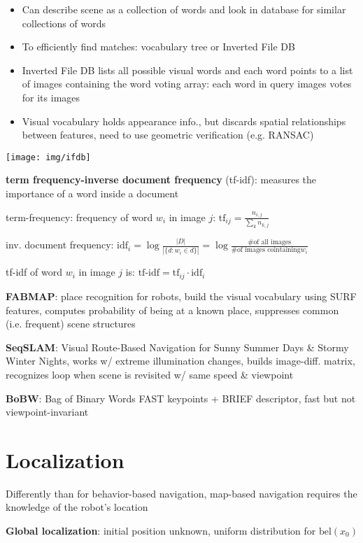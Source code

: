 \documentclass[fontsize=6pt]{scrartcl}
\begin{document}
\begin{multicols*}{4}
\begin{itemize}
	\item Can describe scene as a collection of words and look in database for similar collections of words
	\item To efficiently find matches: vocabulary tree or Inverted File DB
	\item Inverted File DB lists all possible visual words and each word points to a list of images containing the word
	voting array: each word in query images votes for its images
	\item Visual vocabulary holds appearance info., but discards spatial relationships between features, need to use geometric verification (e.g. RANSAC)
\end{itemize}

\texttt{[image: img/ifdb]}

\textbf{term frequency-inverse document frequency} (tf-idf): measures the importance of a word inside a document

term-frequency: frequency of word $w_i$ in image $j$: $\text{tf}_{ij} = \frac{n_{i,j}}{\sum_k n_{k,j}}$

inv. document frequency: $\text{idf}_i = \log \frac{|D|}{|\{d:w_i\in d\}|} = \log \frac{\text{\# of all images}}{\text{\# of images cointaining} w_i}$

tf-idf of word $w_i$ in image $j$ is: $\text{tf-idf} = \text{tf}_{ij}\cdot \text{idf}_i$

\textbf{FABMAP}: place recognition for robots, build the visual vocabulary using SURF features, computes probability of being at a known place, suppresses common (i.e. frequent) scene structures

\textbf{SeqSLAM}: Visual Route-Based Navigation for Sunny Summer Days \& Stormy Winter Nights, works w/ extreme illumination changes, builds image-diff. matrix, recognizes loop when scene is revisited w/ same speed \& viewpoint

\textbf{BoBW}: Bag of Binary Words
FAST keypoints + BRIEF descriptor, fast but not viewpoint-invariant


\section*{Localization}
Differently than for behavior-based navigation, map-based navigation requires the knowledge of the robot’s location

\textbf{Global localization}: initial position unknown, uniform distribution for $\text{bel}(x_0)$


\end{multicols*}
\end{document}
